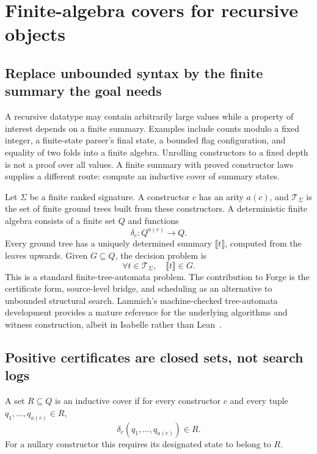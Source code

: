 \section{Finite-algebra covers for recursive objects}
\label{sec:covers}

\subsection{Replace unbounded syntax by the finite summary the goal needs}
A recursive datatype may contain arbitrarily large values while a property of
interest depends on a finite summary. Examples include counts modulo a fixed
integer, a finite-state parser's final state, a bounded flag configuration, and
equality of two folds into a finite algebra. Unrolling constructors to a fixed
depth is not a proof over all values. A finite summary with proved constructor
laws supplies a different route: compute an inductive cover of summary states.

Let $\Sigma$ be a finite ranked signature. A constructor $c$ has an arity
$a(c)$, and $\mathcal T_\Sigma$ is the set of finite ground trees built from
these constructors. A deterministic finite algebra consists of a finite set $Q$
and functions
\[
 \delta_c:Q^{a(c)}\longrightarrow Q.
\]
Every ground tree has a uniquely determined summary $\llbracket t\rrbracket$,
computed from the leaves upwards. Given $G\subseteq Q$, the decision problem is
\begin{equation}
\label{eq:tree-goal}
 \forall t\in\mathcal T_\Sigma,\quad \llbracket t\rrbracket\in G.
\end{equation}
This is a standard finite-tree-automata problem. The contribution to Forge is the
certificate form, source-level bridge, and scheduling as an alternative to
unbounded structural search. Lammich's machine-checked tree-automata development
provides a mature reference for the underlying algorithms and witness
construction, albeit in Isabelle rather than Lean~\cite{afp-tree}.

\subsection{Positive certificates are closed sets, not search logs}
\begin{definition}
A set $R\subseteq Q$ is an inductive cover if for every constructor $c$ and every
tuple $q_1,\ldots,q_{a(c)}\in R$,
\[
 \delta_c(q_1,\ldots,q_{a(c)})\in R.
\]
For a nullary constructor this requires its designated state to belong to $R$.
\end{definition}

